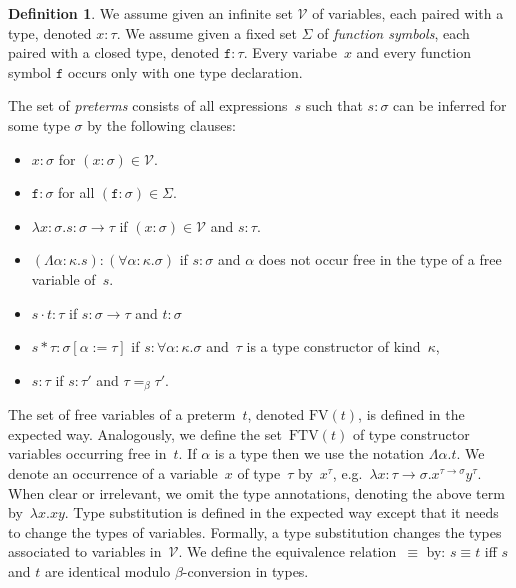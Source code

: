 \documentclass[a4paper,UKenglish,cleveref,autoref,numberwithinsect]{lipics-v2019}
\theoremstyle{definition}
\newtheorem{defn}[theorem]{Definition}
\newcommand{\Vars}{\mathcal{V}}
\newcommand{\arrtype}{\rightarrow}
\newcommand{\quant}[2]{\forall #1.#2}
\newcommand{\app}[2]{#1 \cdot #2}
\newcommand{\tapp}[2]{#1 * #2}
\newcommand{\subst}[2]{#1:=#2}
\newcommand{\abs}[2]{\lambda #1.#2}
\newcommand{\tabs}[2]{\Lambda #1.#2}
\newcommand{\FTV}{\mathrm{FTV}}
\newcommand{\FV}{\mathrm{FV}}
\begin{document}
\begin{defn}\label{def_preterms}
  We assume given an infinite set $\Vars$ of variables, each paired
  with a type, denoted $x : \tau$. We assume given a fixed set
  $\Sigma$ of \emph{function symbols}, each paired with a closed type,
  denoted $\mathtt{f} : \tau$. Every variabe~$x$ and every function
  symbol $\mathtt{f}$ occurs only with one type declaration.

  The set of \emph{preterms} consists of all expressions~$s$ such that
  $s : \sigma$ can be inferred for some type $\sigma$ by the following
  clauses:
  \begin{itemize}
  \item $x : \sigma$ for $(x : \sigma) \in \Vars$.
  \item $\mathtt{f} : \sigma$ for all
    $(\mathtt{f} : \sigma) \in \Sigma$.
  \item $\abs{x:\sigma}{s} : \sigma \arrtype \tau$ if
    $(x : \sigma) \in \Vars$ and $s : \tau$.
  \item $(\tabs{\alpha:\kappa}{s}) : (\quant{\alpha:\kappa}{\sigma})$ if
    $s : \sigma$ and $\alpha$ does not occur free in the type of a
    free variable of~$s$.
  \item $\app{s}{t} : \tau$ if $s : \sigma \arrtype \tau$ and
    $t : \sigma$
  \item $\tapp{s}{\tau} : \sigma[\subst{\alpha}{\tau}]$ if
    $s : \quant{\alpha:\kappa}{\sigma}$ and~$\tau$ is a type
    constructor of kind~$\kappa$,
  \item $s : \tau$ if $s : \tau'$ and $\tau =_\beta \tau'$.
  \end{itemize}
  The set of free variables of a preterm~$t$, denoted $\FV(t)$, is
  defined in the expected way. Analogously, we define the
  set~$\FTV(t)$ of type constructor variables occurring free in~$t$.
  If $\alpha$ is a type then we use the notation $\tabs{\alpha}{t}$.
  We denote an occurrence of a variable~$x$ of type~$\tau$
  by~$x^\tau$,
  e.g.~$\lambda x : \tau\arrtype\sigma
  . x^{\tau\arrtype\sigma}y^\tau$. When clear or irrelevant, we omit
  the type annotations, denoting the above term by~$\lambda x . x
  y$. Type substitution is defined in the expected way except that it
  needs to change the types of variables. Formally, a type
  substitution changes the types associated to variables in~$\Vars$. We
  define the equivalence relation~$\equiv$ by: $s \equiv t$ iff $s$
  and $t$ are identical modulo $\beta$-conversion in types.
\end{defn}
\end{document}
